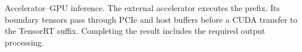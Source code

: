 Accelerator–GPU inference. The external accelerator executes the prefix. Its boundary tensors pass through PCIe and host buffers before a CUDA transfer to the TensorRT suffix. Completing the result includes the required output processing.
